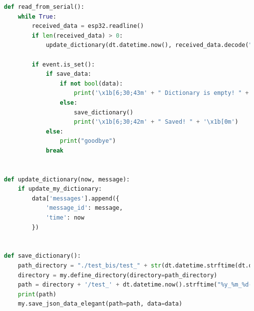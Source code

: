 \begin{lstlisting}[language=Python, caption= lettura tramite porta seriale e creazione con successivo salvataggio del file di log]
def read_from_serial():
    while True:
        received_data = esp32.readline()
        if len(received_data) > 0:
            update_dictionary(dt.datetime.now(), received_data.decode("utf-8"))

        if event.is_set():
            if save_data:
                if not bool(data):
                    print('\x1b[6;30;43m' + " Dictionary is empty! " + '\x1b[0m')
                else:
                    save_dictionary()
                    print('\x1b[6;30;42m' + " Saved! " + '\x1b[0m')
            else:
                print("goodbye")
            break
            
            
def update_dictionary(now, message):
    if update_my_dictionary:
        data['messages'].append({
            'message_id': message,
            'time': now
        })


def save_dictionary():
    path_directory = "./test_bis/test_" + str(dt.datetime.strftime(dt.datetime.now(), "%Y_%m_%d"))
    directory = my.define_directory(directory=path_directory)
    path = directory + '/test_' + dt.datetime.now().strftime("%y_%m_%d-%H_%M_%S") + '.json'
    print(path)
    my.save_json_data_elegant(path=path, data=data)
\end{lstlisting}

